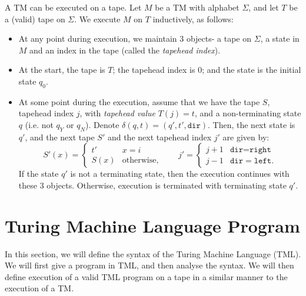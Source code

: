 A TM can be executed on a tape. Let $M$ be a TM with alphabet $\Sigma$, and let $T$ be a (valid) tape on $\Sigma$. We execute $M$ on $T$ inductively, as follows:
\begin{itemize}
    \item At any point during execution, we maintain 3 objects- a tape on $\Sigma$, a state in $M$ and an index in the tape (called the \emph{tapehead index}). 
    \item At the start, the tape is $T$; the tapehead index is $0$; and the state is the initial state $q_0$. 
    \item At some point during the execution, assume that we have the tape $S$, tapehead index $j$, with \emph{tapehead value} $T(j) = t$, and a non-terminating state $q$ (i.e. not $q_Y$ or $q_N$). Denote $\delta(q, t) = (q', t', \texttt{dir})$. Then, the next state is $q'$, and the next tape $S'$ and the next tapehead index $j'$ are given by:
    \[S'(x) = \begin{cases}
        t' & x = i \\
        S(x) & \text{otherwise},
    \end{cases} \qquad j' = \begin{cases}
        j+1 & \texttt{dir} = \texttt{right} \\
        j-1 & \texttt{dir} = \texttt{left}.
    \end{cases}\]
    If the state $q'$ is not a terminating state, then the execution continues with these 3 objects. Otherwise, execution is terminated with terminating state $q'$.
\end{itemize}

\section{Turing Machine Language Program}
In this section, we will define the syntax of the Turing Machine Language (TML). We will first give a program in TML, and then analyse the syntax. We will then define execution of a valid TML program on a tape in a similar manner to the execution of a TM.

